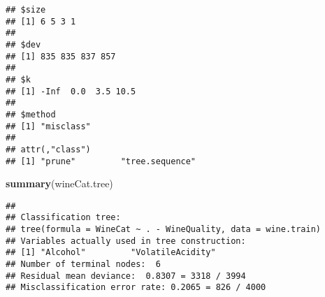 \documentclass[12pt]{article}
\newenvironment{Shaded}{\begin{snugshade}}{\end{snugshade}}
\newcommand{\KeywordTok}[1]{\textcolor[rgb]{0.13,0.29,0.53}{\textbf{#1}}}
\newcommand{\NormalTok}[1]{#1}
\begin{document}
\begin{verbatim}
## $size
## [1] 6 5 3 1
## 
## $dev
## [1] 835 835 837 857
## 
## $k
## [1] -Inf  0.0  3.5 10.5
## 
## $method
## [1] "misclass"
## 
## attr(,"class")
## [1] "prune"         "tree.sequence"
\end{verbatim}

\begin{Shaded}
\begin{Highlighting}[]
\KeywordTok{summary}\NormalTok{(wineCat.tree)}
\end{Highlighting}
\end{Shaded}

\begin{verbatim}
## 
## Classification tree:
## tree(formula = WineCat ~ . - WineQuality, data = wine.train)
## Variables actually used in tree construction:
## [1] "Alcohol"         "VolatileAcidity"
## Number of terminal nodes:  6 
## Residual mean deviance:  0.8307 = 3318 / 3994 
## Misclassification error rate: 0.2065 = 826 / 4000
\end{verbatim}
\end{document}
